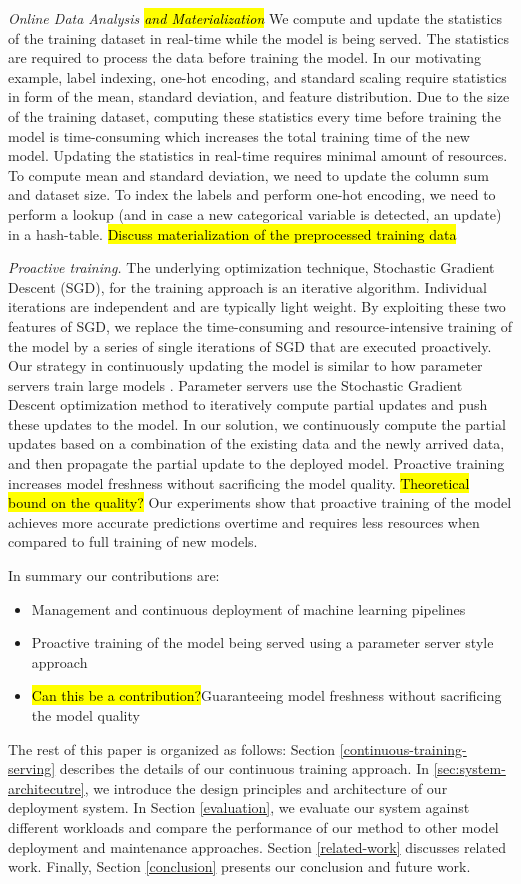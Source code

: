 \textit{Online Data Analysis \hl{and Materialization}} 
We compute and update the statistics of the training dataset in real-time while the model is being served. 
The statistics are required to process the data before training the model.
In our motivating example, label indexing, one-hot encoding, 
and standard scaling require statistics in form of the mean, standard deviation, and feature distribution.
Due to the size of the training dataset, computing these statistics every time before training the model is time-consuming which increases the total training time of the new model.
Updating the statistics in real-time requires minimal amount of resources. 
To compute mean and standard deviation, we need to update the column sum and dataset size.
To index the labels and perform one-hot encoding, we need to perform a lookup (and in case a new categorical variable is detected, an update) in a hash-table. 
\hl{Discuss materialization of the preprocessed training data}

\textit{Proactive training.}
The underlying optimization technique, Stochastic Gradient Descent (SGD), for the training approach is an iterative algorithm.
Individual iterations are independent and are typically light weight.
By exploiting these two features of SGD, we replace the time-consuming and resource-intensive training of the model by a series of single iterations of SGD that are executed proactively.
Our strategy in continuously updating the model is similar to how parameter servers train large models \cite{li2014scaling}.
Parameter servers use the Stochastic Gradient Descent optimization method to iteratively compute partial updates and push these updates to the model.
In our solution, we continuously compute the partial updates based on a combination of the existing data and the newly arrived data, and then propagate the partial update to the deployed model.
Proactive training increases model freshness without sacrificing the model quality.
\hl{Theoretical bound on the quality?}
Our experiments show that proactive training of the model achieves more accurate predictions overtime and requires less resources when compared to full training of new models.

In summary our contributions are:
\begin{itemize}
\item Management and continuous deployment of machine learning pipelines
\item Proactive training of the model being served using a parameter server style approach
\item \hl{Can this be a contribution?}Guaranteeing model freshness without sacrificing the model quality
\end{itemize}

The rest of this paper is organized as follows:
Section \ref{continuous-training-serving} describes the details of our continuous training approach.
In \ref{sec:system-architecutre}, we introduce the design principles and architecture of our deployment system.
In Section \ref{evaluation}, we evaluate our system against different workloads and compare the performance of our method to other model deployment and maintenance approaches. 
Section \ref {related-work} discusses related work.
Finally, Section \ref{conclusion} presents our conclusion and future work.
